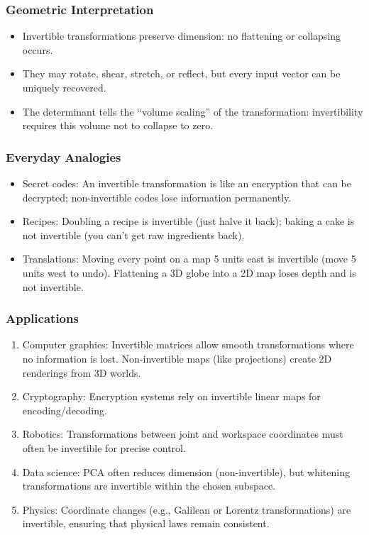 \documentclass[
  letterpaper,
  DIV=11,
  numbers=noendperiod]{scrreprt}
\providecommand{\tightlist}{%
  \setlength{\itemsep}{0pt}\setlength{\parskip}{0pt}}
\begin{document}
\subsubsection{Geometric
Interpretation}\label{geometric-interpretation-8}

\begin{itemize}
\tightlist
\item
  Invertible transformations preserve dimension: no flattening or
  collapsing occurs.
\item
  They may rotate, shear, stretch, or reflect, but every input vector
  can be uniquely recovered.
\item
  The determinant tells the ``volume scaling'' of the transformation:
  invertibility requires this volume not to collapse to zero.
\end{itemize}

\subsubsection{Everyday Analogies}\label{everyday-analogies-40}

\begin{itemize}
\tightlist
\item
  Secret codes: An invertible transformation is like an encryption that
  can be decrypted; non-invertible codes lose information permanently.
\item
  Recipes: Doubling a recipe is invertible (just halve it back); baking
  a cake is not invertible (you can't get raw ingredients back).
\item
  Translations: Moving every point on a map 5 units east is invertible
  (move 5 units west to undo). Flattening a 3D globe into a 2D map loses
  depth and is not invertible.
\end{itemize}

\subsubsection{Applications}\label{applications-7}

\begin{enumerate}
\def\labelenumi{\arabic{enumi}.}
\tightlist
\item
  Computer graphics: Invertible matrices allow smooth transformations
  where no information is lost. Non-invertible maps (like projections)
  create 2D renderings from 3D worlds.
\item
  Cryptography: Encryption systems rely on invertible linear maps for
  encoding/decoding.
\item
  Robotics: Transformations between joint and workspace coordinates must
  often be invertible for precise control.
\item
  Data science: PCA often reduces dimension (non-invertible), but
  whitening transformations are invertible within the chosen subspace.
\item
  Physics: Coordinate changes (e.g., Galilean or Lorentz
  transformations) are invertible, ensuring that physical laws remain
  consistent.
\end{enumerate}
\end{document}
